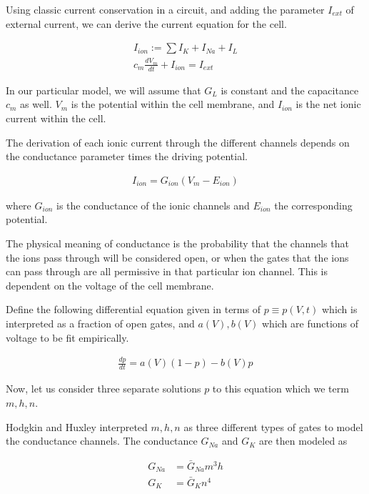 \documentclass[12]{book}
\newcommand\0{\mathbf{0}}
\newcommand\<{\langle}
\renewcommand\>{\rangle}
\begin{document}
Using classic current conservation in a circuit, and adding the parameter $I_{ext}$ of external current, we can derive the current equation for the cell.

\begin{align}
I_{ion} := \sum I_{K} + I_{Na} + I_L \\
    c_m\frac{dV_m}{dt} + I_{ion} = I_{ext}
\label{eq:conduct}
\end{align}

In our particular model, we will assume that $G_L$ is constant and the capacitance $c_m$ as well. $V_m$ is the potential within the cell membrane, and $I_{ion}$ is the net ionic current within the cell.

The derivation of each ionic current through the different channels depends on the conductance parameter times the driving potential.

\begin{align*}
    I_{ion} = G_{ion}(V_{m}-E_{ion})
\end{align*}

where $G_{ion}$ is the conductance of the ionic channels and $E_{ion}$ the corresponding potential.

The physical meaning of conductance is the probability that the channels that the ions pass through will be considered open, or when the gates that the ions can pass through are all permissive in that particular ion channel. This is dependent on the voltage of the cell membrane. 

Define the following differential equation given in terms of $p \equiv p(V, t)$ which is interpreted as a fraction of open gates, and $a(V), b(V)$ which are functions of voltage to be fit empirically. 

\begin{align}
    \frac{dp}{dt} = a(V)(1-p) - b(V)p
    \label{eq:dpdt}
\end{align}

Now, let us consider three separate solutions $p$ to this equation which we term $m, h, n$. 

Hodgkin and Huxley interpreted $m, h, n$ as three different types of gates to model the conductance channels. The conductance $G_{Na}$ and $G_K$ are then modeled as

\begin{align*}
    G_{Na} &= \bar{G}_{Na}m^3h\\
    G_{K} &= \bar{G}_{K}n^4
    \label{eq:gating}
\end{align*}
\end{document}
